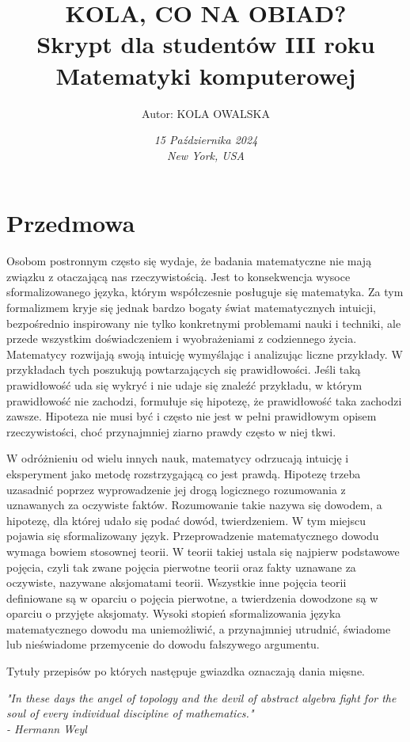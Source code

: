 \documentclass[a4paper,10pt]{book}
\title{\Huge \textbf{KOLA, CO NA OBIAD?}\\
\vspace{0.5cm}
\Large Skrypt dla studentów III roku Matematyki komputerowej}
\author{Autor: KOLA OWALSKA}
\date{\vfill \large \textit{15 Października 2024}\\
\textit{New York, USA}}
\begin{document}
\maketitle
\newpage

\chapter*{Przedmowa} 
\thispagestyle{empty} 

Osobom postronnym często się wydaje, że badania matematyczne nie mają związku z otaczającą nas rzeczywistością. Jest to konsekwencja wysoce sformalizowanego języka, którym współczesnie posługuje się matematyka. Za tym formalizmem kryje się jednak bardzo bogaty świat matematycznych intuicji, bezpośrednio inspirowany nie tylko konkretnymi problemami nauki i techniki, ale przede wszystkim doświadczeniem i wyobrażeniami z codziennego życia. Matematycy rozwijają swoją intuicję wymyślając i analizując liczne przykłady. W przykładach tych poszukują powtarzających się prawidłowości. Jeśli taką prawidłowość uda się wykryć i nie udaje się znaleźć przykładu, w którym prawidłowość nie zachodzi, formułuje się hipotezę, że prawidłowość taka zachodzi zawsze. Hipoteza nie musi być i często nie jest w pełni prawidłowym opisem rzeczywistości, choć przynajmniej ziarno prawdy często w niej tkwi.

W odróżnieniu od wielu innych nauk, matematycy odrzucają intuicję i eksperyment jako metodę rozstrzygającą co jest prawdą. Hipotezę trzeba uzasadnić poprzez wyprowadzenie jej drogą logicznego rozumowania z uznawanych za oczywiste faktów. Rozumowanie takie nazywa się dowodem, a hipotezę, dla której udało się podać dowód, twierdzeniem. W tym miejscu pojawia się sformalizowany język. Przeprowadzenie matematycznego dowodu wymaga bowiem stosownej teorii. W teorii takiej ustala się najpierw podstawowe pojęcia, czyli tak zwane pojęcia pierwotne teorii oraz fakty uznawane za oczywiste, nazywane aksjomatami teorii. Wszystkie inne pojęcia teorii definiowane są w oparciu o pojęcia pierwotne, a twierdzenia dowodzone są w oparciu o przyjęte aksjomaty. Wysoki stopień sformalizowania języka matematycznego dowodu ma uniemożliwić, a przynajmniej utrudnić, świadome lub nieświadome przemycenie do dowodu fałszywego argumentu.

Tytuły przepisów po których następuje gwiazdka oznaczają dania mięsne.

\bigskip 
\begin{flushright}
    \textit{"In these days the angel of topology and the devil of abstract algebra fight for the soul of every individual discipline of mathematics."} \\
    \textit{- Hermann Weyl}
\end{flushright}
\end{document}
